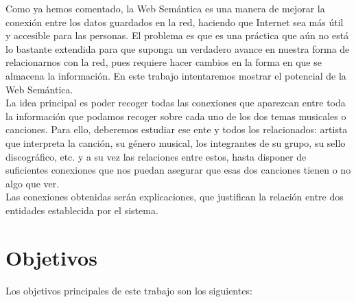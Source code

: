 Como ya hemos comentado, la Web Semántica es una manera de mejorar la conexión entre los datos guardados en la red, haciendo que Internet sea más útil y accesible para las personas. El problema es que es una práctica que aún no está lo bastante extendida para que suponga un verdadero avance en nuestra forma de relacionarnos con la red, pues requiere hacer cambios en la forma en que se almacena la información. En este trabajo intentaremos mostrar el potencial de la Web Semántica.\\

La idea principal es poder recoger todas las conexiones que aparezcan entre toda la información que podamos recoger sobre cada uno de los dos temas musicales o canciones. Para ello, deberemos estudiar ese ente y todos los relacionados: artista que interpreta la canción, su género musical, los integrantes de su grupo, su sello discográfico, etc. y a su vez las relaciones entre estos, hasta disponer de suficientes conexiones que nos puedan asegurar que esas dos canciones tienen o no algo que ver.\\

Las conexiones obtenidas serán explicaciones, que justifican la relación entre dos entidades establecida por el sistema.\\

\section{Objetivos}

Los objetivos principales de este trabajo son los siguientes:\\

